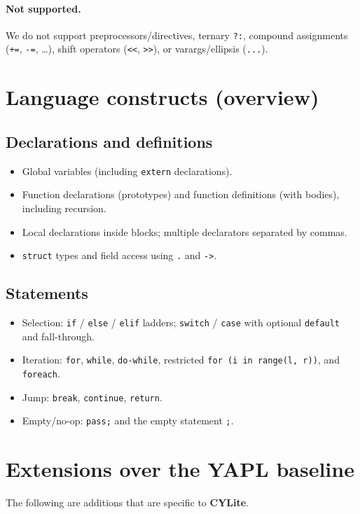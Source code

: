\documentclass[11pt]{article}
\newcommand{\lang}{\textbf{CYLite}}
\begin{document}
\paragraph{Not supported.}
We do not support preprocessors/directives, ternary \texttt{?:}, compound assignments (\texttt{+=}, \texttt{-=}, \dots), shift operators (\texttt{<<}, \texttt{>>}), or varargs/ellipsis (\texttt{...}).

\section{Language constructs (overview)}
\subsection*{Declarations and definitions}
\begin{itemize}
	\item Global variables (including \texttt{extern} declarations).
	\item Function declarations (prototypes) and function definitions (with bodies), including recursion.
	\item Local declarations inside blocks; multiple declarators separated by commas.
	\item \texttt{struct} types and field access using \texttt{.} and \texttt{->}.
\end{itemize}

\subsection*{Statements}
\begin{itemize}
	\item Selection: \texttt{if} / \texttt{else} / \texttt{elif} ladders; \texttt{switch} / \texttt{case} with optional \texttt{default} and fall-through.
	\item Iteration: \texttt{for}, \texttt{while}, \texttt{do-while}, restricted \texttt{for (i in range(l, r))}, and \texttt{foreach}.
	\item Jump: \texttt{break}, \texttt{continue}, \texttt{return}.
	\item Empty/no-op: \texttt{pass;} and the empty statement \texttt{;}.
\end{itemize}

\section{Extensions over the YAPL baseline}
\label{sec:extensions}
The following are additions that are specific to \lang{}.
\end{document}
